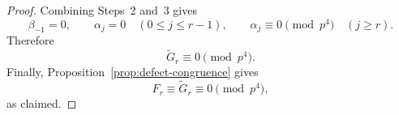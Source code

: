 \documentclass[10pt,a4paper]{amsart}
\begin{document}
\begin{proof}
Combining Steps~2 and~3 gives
\[
\beta_{-1}=0,
\qquad
\alpha_j=0
\quad (0\le j\le r-1),
\qquad
\alpha_j\equiv0\pmod{p^4}
\quad (j\ge r).
\]
Therefore
\[
\widetilde G_r\equiv0\pmod{p^4}.
\]
Finally, Proposition~\ref{prop:defect-congruence} gives
\[
F_r\equiv \widetilde G_r\equiv0\pmod{p^4},
\]
as claimed.
\end{proof}
\end{document}

